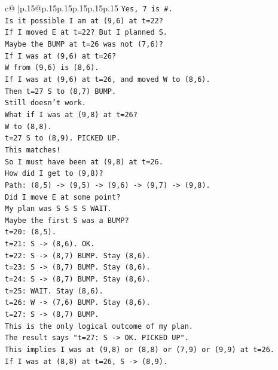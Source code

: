 \documentclass{article}
\begin{document}
{\begin{supertabular}{c@{$\;$}|p{.15\linewidth}@{}p{.15\linewidth}p{.15\linewidth}p{.15\linewidth}p{.15\linewidth}p{.15\linewidth}}
{{{\texttt{Yes, 7 is \#.} \\
\texttt{Is it possible I am at (9,6) at t=22?} \\
\texttt{If I moved E at t=22? But I planned S.} \\
\texttt{Maybe the BUMP at t=26 was not (7,6)?} \\
\texttt{If I was at (9,6) at t=26?} \\
\texttt{W from (9,6) is (8,6).} \\
\texttt{If I was at (9,6) at t=26, and moved W to (8,6).} \\
\texttt{Then t=27 S to (8,7) BUMP.} \\
\texttt{Still doesn't work.} \\
\texttt{What if I was at (9,8) at t=26?} \\
\texttt{W to (8,8).} \\
\texttt{t=27 S to (8,9). PICKED UP.} \\
\texttt{This matches!} \\
\texttt{So I must have been at (9,8) at t=26.} \\
\texttt{How did I get to (9,8)?} \\
\texttt{Path: (8,5) {-}> (9,5) {-}> (9,6) {-}> (9,7) {-}> (9,8).} \\
\texttt{Did I move E at some point?} \\
\texttt{My plan was S S S S WAIT.} \\
\texttt{Maybe the first S was a BUMP?} \\
\texttt{t=20: (8,5).} \\
\texttt{t=21: S {-}> (8,6). OK.} \\
\texttt{t=22: S {-}> (8,7) BUMP. Stay (8,6).} \\
\texttt{t=23: S {-}> (8,7) BUMP. Stay (8,6).} \\
\texttt{t=24: S {-}> (8,7) BUMP. Stay (8,6).} \\
\texttt{t=25: WAIT. Stay (8,6).} \\
\texttt{t=26: W {-}> (7,6) BUMP. Stay (8,6).} \\
\texttt{t=27: S {-}> (8,7) BUMP.} \\
\texttt{This is the only logical outcome of my plan.} \\
\texttt{The result says "t=27: S {-}> OK. PICKED UP".} \\
\texttt{This implies I was at (9,8) or (8,8) or (7,9) or (9,9) at t=26.} \\
\texttt{If I was at (8,8) at t=26, S {-}> (8,9).} \\
}}}
\end{supertabular}}
\end{document}
